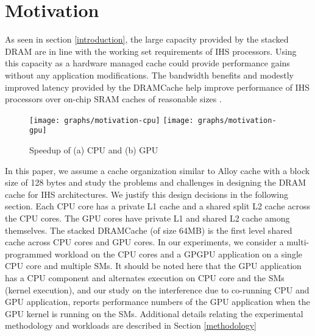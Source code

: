\section{Motivation} \label{motivation}
As seen in section \ref{introduction}, the large capacity provided by the stacked DRAM are in line with the working set requirements of IHS processors. Using this capacity as a hardware managed cache could provide performance gains without any application modifications. The bandwidth benefits and modestly improved latency provided by the DRAMCache help improve performance of IHS processors over on-chip SRAM caches of reasonable sizes \cite{amd-exascale1}. 
\begin{figure}[htbp]
   \texttt{[image: graphs/motivation-cpu]}
   \texttt{[image: graphs/motivation-gpu]}
   \caption{Speedup of (a) CPU and (b) GPU}
   \label{fig:motivation}
\end{figure}
In this paper, we assume a cache organization similar to Alloy cache \cite{alloy} with a block size of 128 bytes and study the problems and challenges in designing the DRAM cache for IHS architectures. We justify this design decisions in the following section. 
Each CPU core has a private L1 cache and a shared split L2 cache across the CPU cores. The GPU cores have private L1 and shared L2 cache among themselves.  
The stacked DRAMCache (of size 64MB) is the first level shared cache across CPU cores and GPU cores. In our experiments, we consider a multi-programmed workload on the CPU cores and a GPGPU application on a single CPU core and multiple SMs. It should be noted here that the GPU application has a CPU component and alternates execution on CPU core and the SMs (kernel execution), and our study on the interference due to co-running CPU and GPU application, reports performance numbers of the GPU application when the GPU kernel is running on the SMs.  
Additional details relating the experimental methodology and workloads are described in Section \ref{methodology}


